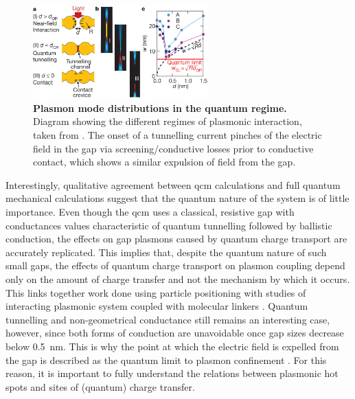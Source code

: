\documentclass{article}
\begin{document}
\begin{figure}[bt]
\centering
\includegraphics[width=0.6\textwidth]{figures/literature/nature11653-f3_2}
\caption[Plasmon mode distributions in the quantum regime]{\textbf{Plasmon mode distributions in the quantum regime.} Diagram showing the different regimes of plasmonic interaction, taken from \cite{savage2012}. The onset of a tunnelling current pinches of the electric field in the gap via screening/conductive losses prior to conductive contact, which shows a similar expulsion of field from the gap.}
\label{fig:savage2012c}
\end{figure}

Interestingly, qualitative agreement between \gls{qcm} calculations and full quantum mechanical calculations suggest that the quantum nature of the system is of little importance. Even though the \gls{qcm} uses a classical, resistive gap with conductances values characteristic of quantum tunnelling followed by ballistic conduction, the effects on gap plasmons caused by quantum charge transport are accurately replicated. This implies that, despite the quantum nature of such small gaps, the effects of quantum charge transport on plasmon coupling depend only on the amount of charge transfer and not the mechanism by which it occurs. This links together work done using particle positioning \cite{savage2012, scholl2013} with studies of interacting plasmonic system coupled with molecular linkers \cite{tan2014, cha2014, benz2014}. Quantum tunnelling and non-geometrical conductance still remains an interesting case, however, since both forms of conduction are unavoidable once gap sizes decrease below \SI{0.5}{nm}. This is why the point at which the electric field is expelled from the gap is described as the quantum limit to plasmon confinement \cite{savage2012}. For this reason, it is important to fully understand the relations between plasmonic hot spots and sites of (quantum) charge transfer.
\end{document}
